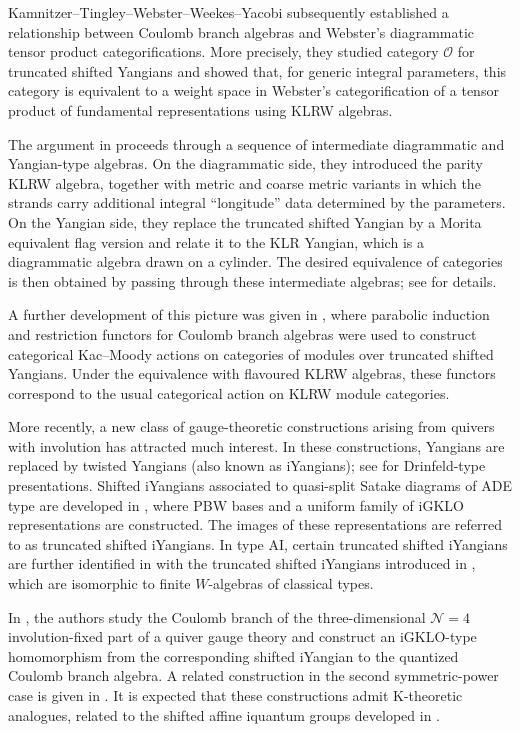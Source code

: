 \documentclass[12pt,openany]{amsart}
\begin{document}
Kamnitzer--Tingley--Webster--Weekes--Yacobi \cite{KTWWY19} subsequently established a relationship between Coulomb branch algebras and Webster's diagrammatic tensor product categorifications. More precisely, they studied category $\mathcal O$ for truncated shifted Yangians and showed that, for generic integral parameters, this category is equivalent to a weight space in Webster's categorification of a tensor product of fundamental representations using KLRW algebras. 

The argument in \cite{KTWWY19} proceeds through a sequence of intermediate diagrammatic and Yangian-type algebras. On the diagrammatic side, they introduced the parity KLRW algebra, together with metric and coarse metric variants in which the strands carry additional integral ``longitude'' data determined by the parameters.  On the Yangian side, they replace the truncated shifted Yangian by a Morita equivalent flag version and relate it to the KLR Yangian, which is a diagrammatic algebra drawn on a cylinder. The desired equivalence of categories is then obtained by passing through these intermediate algebras; see \cite[Sect. 1.7]{KTWWY19} for details.

A further development of this picture was given in \cite{KWWY24}, where
parabolic induction and restriction functors for Coulomb branch algebras were
used to construct categorical Kac--Moody actions on categories of modules over
truncated shifted Yangians. Under the equivalence with flavoured KLRW algebras,
these functors correspond to the usual categorical action on KLRW module
categories.

More recently, a new class of gauge-theoretic constructions arising from quivers with involution has attracted much interest.
In these constructions, Yangians are replaced by twisted Yangians (also known as iYangians); see \cite{LZ24,LWZ25} for Drinfeld-type presentations.
Shifted iYangians associated to quasi-split Satake diagrams of ADE type are developed in \cite{LWW}, where PBW bases and a uniform family of iGKLO representations are constructed.
The images of these representations are referred to as truncated shifted iYangians.
In type AI, certain truncated shifted iYangians are further identified in \cite{LWW2} with the truncated shifted iYangians introduced in \cite{LPTTW25}, which are isomorphic to finite $W$-algebras of classical types.


In \cite{SSX25}, the authors study the Coulomb branch of the
three-dimensional $\mathcal N=4$ involution-fixed part of a quiver gauge
theory and construct an iGKLO-type homomorphism from the corresponding
shifted iYangian to the quantized Coulomb branch algebra. A related
construction in the second symmetric-power case is given in \cite{Wang25}.
It is expected that these constructions admit K-theoretic analogues,
related to the shifted affine iquantum groups developed in
\cite{LP26,LWW26}.
\end{document}
